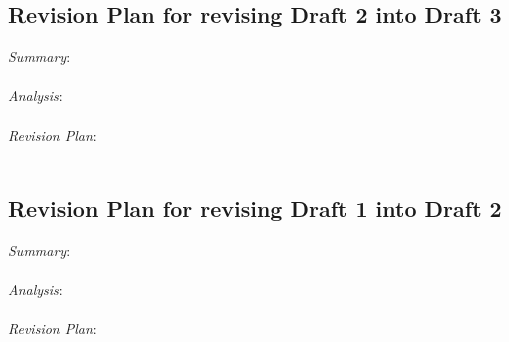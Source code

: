 \documentclass[12pt]{article}
\begin{document}
\subsection*{Revision Plan for revising Draft 2 into Draft 3}
\noindent \textit{Summary}: \\ \\ 
\textit{Analysis}: \\ \\
\textit{Revision Plan}: \\ \\


\subsection*{Revision Plan for revising Draft 1 into Draft 2}
\noindent \textit{Summary}: \\ \\
\textit{Analysis}: 
 \\ \\
\textit{Revision Plan}:  


\newpage
\end{document}
